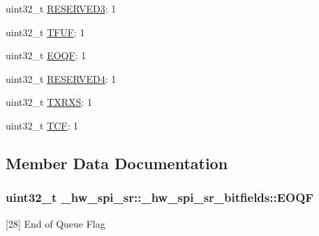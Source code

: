 \begin{DoxyCompactItemize}
uint32\+\_\+t \hyperlink{struct__hw__spi__sr_1_1__hw__spi__sr__bitfields_a3afb561bbda77a93a13c10c58a05e3e6}{R\+E\+S\+E\+R\+V\+E\+D3}\+: 1
\item 
uint32\+\_\+t \hyperlink{struct__hw__spi__sr_1_1__hw__spi__sr__bitfields_ae6e2cd3062798ed3153723b4bd0f0928}{T\+F\+UF}\+: 1
\item 
uint32\+\_\+t \hyperlink{struct__hw__spi__sr_1_1__hw__spi__sr__bitfields_a5bd2d3db14f8421f9319a5705ebf1c84}{E\+O\+QF}\+: 1
\item 
uint32\+\_\+t \hyperlink{struct__hw__spi__sr_1_1__hw__spi__sr__bitfields_a00d870f4ef3a4a89497aa0b250be1e1a}{R\+E\+S\+E\+R\+V\+E\+D4}\+: 1
\item 
uint32\+\_\+t \hyperlink{struct__hw__spi__sr_1_1__hw__spi__sr__bitfields_a51c630e1e41e8c82badebafb465d2da5}{T\+X\+R\+XS}\+: 1
\item 
uint32\+\_\+t \hyperlink{struct__hw__spi__sr_1_1__hw__spi__sr__bitfields_a213384e49611c830d9acbfb60edfd401}{T\+CF}\+: 1
\end{DoxyCompactItemize}


\subsection{Member Data Documentation}
\subsubsection[{\texorpdfstring{E\+O\+QF}{EOQF}}]{\setlength{\rightskip}{0pt plus 5cm}uint32\+\_\+t \+\_\+hw\+\_\+spi\+\_\+sr\+::\+\_\+hw\+\_\+spi\+\_\+sr\+\_\+bitfields\+::\+E\+O\+QF}\hypertarget{struct__hw__spi__sr_1_1__hw__spi__sr__bitfields_a5bd2d3db14f8421f9319a5705ebf1c84}{}\label{struct__hw__spi__sr_1_1__hw__spi__sr__bitfields_a5bd2d3db14f8421f9319a5705ebf1c84}
\mbox{[}28\mbox{]} End of Queue Flag 
